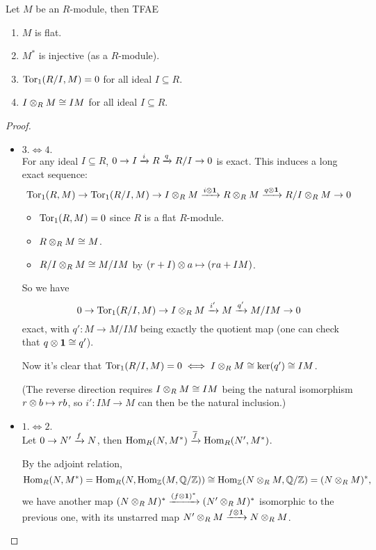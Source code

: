 \begin{prop}
  Let $M$ be an $R$-module, then TFAE
  \begin{enumerate}
    \item $M$ is flat.
    \item $M^*$ is injective (as a $R$-module).
    \item $\operatorname{Tor}_1(R/I, M) = 0$ for all ideal $I \subseteq R$.
    \item $I \otimes_R M \cong IM$ for all ideal $I \subseteq R$.
  \end{enumerate}

  \begin{proof} \mbox{}
    \begin{itemize}
      \item $3. \iff 4.$ \\
        For any ideal $I \subseteq R$,
        $0 \to I \xrightarrow{i} R \xrightarrow{q} R/I \to 0$
        is exact.
        This induces a long exact sequence:
        $$\operatorname{Tor}_1(R, M) \to \operatorname{Tor}_1(R/I, M) \to I \otimes_R M \xrightarrow{i \otimes \mathbf{1}} R \otimes_R M \xrightarrow{q \otimes \mathbf{1}} R/I \otimes_R M \to 0$$
        \begin{itemize}
          \item $\operatorname{Tor}_1(R, M) = 0$ since $R$ is a flat $R$-module.
          \item $R \otimes_R M \cong M$.
          \item $R/I \otimes_R M \cong M/IM$ by $(r + I) \otimes a \mapsto (ra + IM)$.
        \end{itemize}
        So we have
        $$0 \to \operatorname{Tor}_1(R/I, M) \to I \otimes_R M \xrightarrow{i'} M \xrightarrow{q'} M/IM \to 0$$
        exact, with $q' : M \to M/IM$ being exactly the quotient map (one can check
        that $q \otimes \mathbf{1} \cong q'$).

        Now it's clear that $\operatorname{Tor}_1(R/I, M) = 0 \iff I \otimes_R M \cong \ker(q') \cong IM$.

        (The reverse direction requires $I \otimes_R M \cong IM$ being the natural isomorphism
        $r \otimes b \mapsto rb$, so $i' : IM \to M$ can then be the natural inclusion.)

      \item $1. \iff 2.$ \\
        Let $0 \to N' \xrightarrow{f} N$, then $\operatorname{Hom}_R(N, M^*) \xrightarrow{\overline{f}} \operatorname{Hom}_R(N', M^*)$.

        By the adjoint relation, 
        $$\operatorname{Hom}_R(N, M^*) = \operatorname{Hom}_R(N, \operatorname{Hom}_{\mathbb{Z}}(M, \mathbb{Q}/\mathbb{Z}))
        \cong \operatorname{Hom}_{\mathbb{Z}}(N \otimes_R M, \mathbb{Q}/\mathbb{Z}) = (N \otimes_R M)^*,$$
        we have another map $(N \otimes_R M)^* \xrightarrow{(f \otimes \mathbf{1})^*} (N' \otimes_R M)^*$
        isomorphic to the previous one, with its unstarred map
        $N' \otimes_R M \xrightarrow{f \otimes \mathbf{1}} N \otimes_R M$.


\end{itemize}
\end{proof}
\end{prop}
